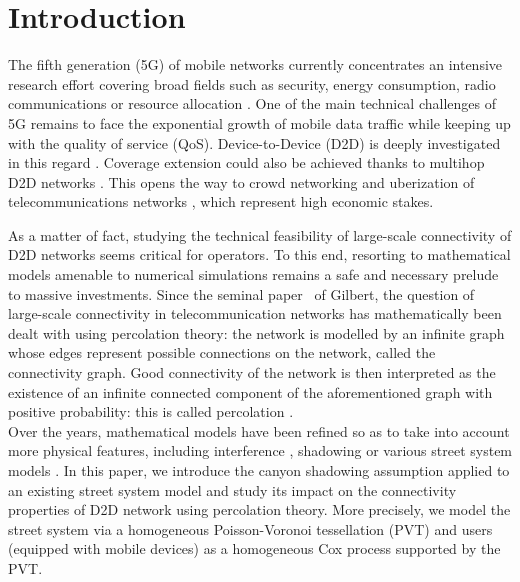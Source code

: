 \documentclass[conference]{IEEEtran}
\begin{document}
\section{Introduction}
The fifth generation (5G) of mobile networks currently concentrates an
intensive research effort covering broad fields such as security,
energy consumption, radio communications or resource allocation
\cite{andrews2014will, boccardi2014five,wang2014cellular}. One of the main technical challenges of 5G remains to
face the exponential growth of mobile data traffic while keeping up
with the quality of service (QoS). Device-to-Device (D2D) is deeply
investigated in this regard \cite{tehrani2014device}. Coverage extension could
also be achieved thanks to multihop D2D networks \cite{lin2013comprehensive}. This
opens the way to crowd networking and uberization of telecommunications networks \cite{asadi2014survey}, which represent high economic stakes. 

As a matter of fact, studying the technical feasibility of
large-scale connectivity of D2D networks seems critical for
operators. To this end, resorting to mathematical models amenable to
numerical simulations remains a safe and necessary prelude to massive
investments. Since the seminal paper~\cite{gilbert1961random} of Gilbert, the
question of large-scale connectivity in telecommunication networks has mathematically been dealt with using percolation theory: the network is modelled by an infinite  graph whose edges represent possible connections on the network, called the connectivity graph. Good connectivity of the network is then interpreted as the existence of an infinite connected component of the aforementioned graph with positive probability: this is called percolation \cite{meester_continuum_1996,grimmett2013percolation}. \\
\indent Over the years, mathematical models have been refined so as
to take into account more physical features,
including  interference \cite{dousse2005impact}, shadowing or  various street system models \cite{gloaguen2006fitting}. 
In this paper, we introduce the canyon shadowing assumption applied to an existing \cite{gloaguen2006fitting} street system model and study its impact on the
connectivity properties of D2D network using percolation theory. More precisely, %
we model the street system via a homogeneous  Poisson-Voronoi
tessellation (PVT) and  users (equipped with mobile devices) as a
homogeneous Cox process supported by the PVT. 
\end{document}

